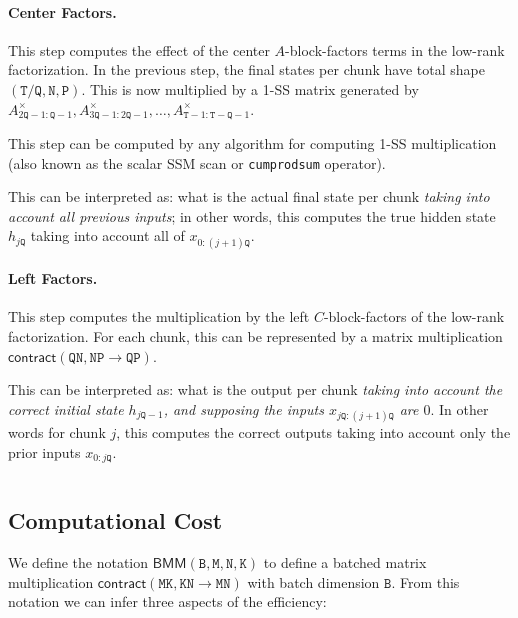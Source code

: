 \paragraph{Center Factors.}

This step computes the effect of the center $A$-block-factors terms in the low-rank factorization. In the previous step, the final states per chunk have total shape $\mathtt{(\mathtt{T}/\mathtt{Q},\mathtt{N},\mathtt{P})}$.
This is now multiplied by a 1-SS matrix generated by $A_{2\mathtt{Q}-1:\mathtt{Q}-1}^\times, A_{3\mathtt{Q}-1:2\mathtt{Q}-1}^\times, \dots, A_{\mathtt{T}-1:\mathtt{T}-\mathtt{Q}-1}^\times$.

This step can be computed by any algorithm for computing 1-SS multiplication (also known as the scalar SSM scan or \texttt{cumprodsum} operator).

This can be interpreted as: what is the actual final state per chunk \emph{taking into account all previous inputs}; in other words, this computes the true hidden state $h_{j\mathtt{Q}}$ taking into account all of $x_{0:(j+1)\mathtt{Q}}$.

\paragraph{Left Factors.}

This step computes the multiplication by the left $C$-block-factors of the low-rank factorization. For each chunk, this can be represented by a matrix multiplication
$\mathsf{contract}(\mathtt{QN,NP \to QP})$.

This can be interpreted as: what is the output per chunk \emph{taking into account the correct initial state $h_{j\mathtt{Q}-1}$, and supposing the inputs $x_{j\mathtt{Q}:(j+1)\mathtt{Q}}$ are $0$}. In other words for chunk $j$, this computes the correct outputs taking into account only the prior inputs $x_{0:j\mathtt{Q}}$.

\begin{listing*}[!t]
\inputminted[fontsize=\footnotesize]{python}{structure/code.py}
\caption{Full PyTorch example of the state space dual (SSD) model.}
\label{listing}
\end{listing*}

\subsection{Computational Cost}

We define the notation $\mathsf{BMM}(\mathtt{B}, \mathtt{M}, \mathtt{N}, \mathtt{K})$ to define a batched matrix multiplication $\mathsf{contract}(\mathtt{\mathtt{MK},\mathtt{KN} \to \mathtt{MN}})$ with batch dimension $\mathtt{B}$.
From this notation we can infer three aspects of the efficiency:

